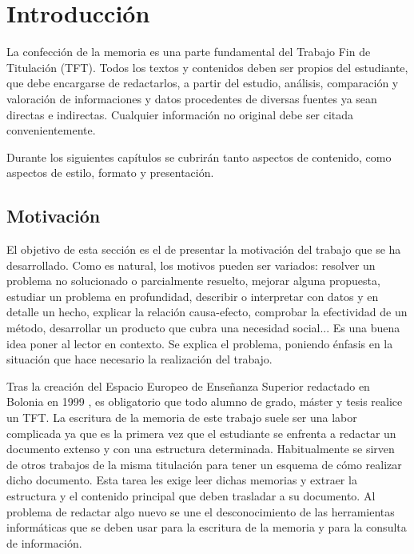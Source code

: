 \documentclass[12pt,spanish,chapterprefix, numbers=noenddot]{book}
\providecommand{\printnomenclature}{\printglossary}
\numberwithin{equation}{section}
\numberwithin{figure}{section}
\begin{document}
    \tableofcontents{}

    \listoftables

    \listoffigures


    \settowidth{\nomlabelwidth}{notepad}
    \printnomenclature{}

    \mainmatter

    \chapter{Introducción}

    La confección de la memoria es una parte fundamental del Trabajo Fin
    de Titulación (TFT).
    Todos los textos y contenidos deben ser propios del estudiante, que
    debe encargarse de redactarlos, a partir del estudio, análisis, comparación
    y valoración de informaciones y datos procedentes de diversas fuentes
    ya sean directas e indirectas. Cualquier información no original debe
    ser citada convenientemente.

    Durante los siguientes capítulos se cubrirán tanto aspectos de contenido,
    como aspectos de estilo, formato y presentación.

    \section{Motivación}

    El objetivo de esta sección es el de presentar la motivación del trabajo
    que se ha desarrollado. Como es natural, los motivos pueden ser variados:
    resolver un problema no solucionado o parcialmente resuelto, mejorar
    alguna propuesta, estudiar un problema en profundidad, describir o
    interpretar con datos y en detalle un hecho, explicar la relación
    causa-efecto, comprobar la efectividad de un método, desarrollar un
    producto que cubra una necesidad social... Es una buena idea poner
    al lector en contexto. Se explica el problema, poniendo énfasis en
    la situación que hace necesario la realización del trabajo.

    Tras la creación del Espacio Europeo de Enseñanza Superior redactado
    en Bolonia en 1999 \cite{EEES}, es obligatorio que todo alumno de
    grado, máster y tesis realice un TFT. La escritura de la memoria de
    este trabajo suele ser una labor complicada ya que es la primera vez
    que el estudiante se enfrenta a redactar un documento extenso y con
    una estructura determinada. Habitualmente se sirven de otros trabajos
    de la misma titulación para tener un esquema de cómo realizar dicho
    documento. Esta tarea les exige leer dichas memorias y extraer la
    estructura y el contenido principal que deben trasladar a su documento.
    Al problema de redactar algo nuevo se une el desconocimiento de las
    herramientas informáticas que se deben usar para la escritura de la
    memoria y para la consulta de información.
\end{document}
